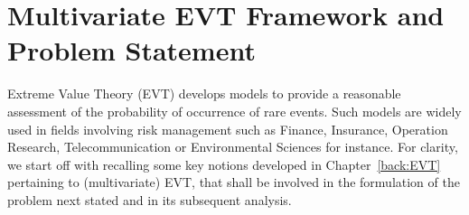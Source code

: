 \section{Multivariate EVT Framework and Problem Statement}
\label{jmva:sec:framework}
%
%

Extreme Value Theory (\textsc{EVT}) develops models to provide a reasonable
assessment of the probability of occurrence of rare events. Such models are widely used in fields
involving risk management such as Finance, Insurance, Operation Research, Telecommunication
or Environmental Sciences for instance. For clarity, we start off with recalling some key notions developed in Chapter~\ref{back:EVT} pertaining to (multivariate) \textsc{EVT}, that shall be involved in the formulation of the problem next stated and in its subsequent analysis. 


